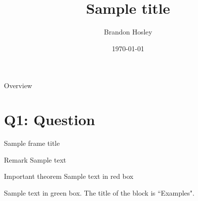 \documentclass{beamer}
\title{Sample title}
\author{Brandon Hosley}
\institute{University of Illinois - Springfield}
\date{\today}
\begin{document}
\frame{\titlepage}

\begin{frame}{Overview}
\tableofcontents
\end{frame}

\section[Q1]{Q1: Question}

\begin{frame}{Sample frame title}
\begin{block}{Remark}
	Sample text
\end{block}

\begin{alertblock}{Important theorem}
	Sample text in red box
\end{alertblock}

\begin{examples}
	Sample text in green box. The title of the block is ``Examples".
\end{examples}

\end{frame}
\end{document}
